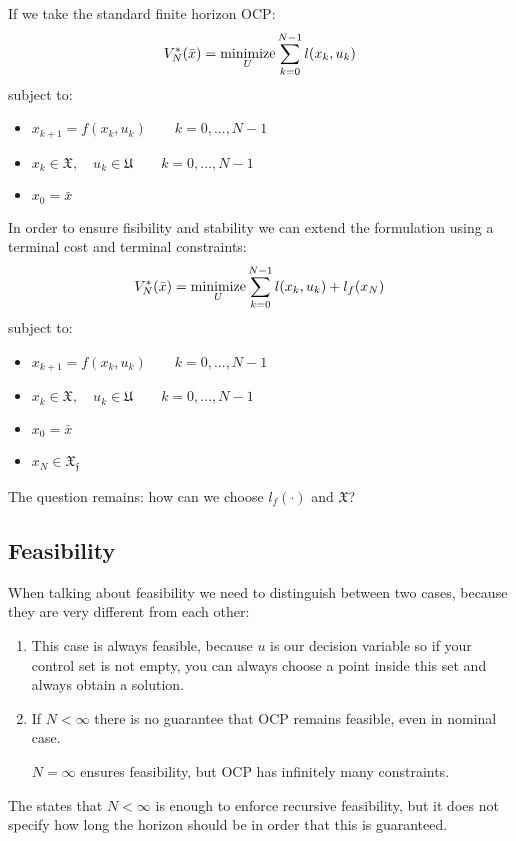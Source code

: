 If we take the standard finite horizon OCP:
\[V^*_N(\bar{x}) = \operatorname*{minimize}_U \sum_{k=0}^{N-1} l(x_k, u_k)\]
subject to:
\begin{itemize}
\item $x_{k+1} = f(x_k, u_k)\qquad k = 0,...,N-1$
\item $x_k\in\mathfrak{X},\quad u_k\in\mathfrak{U}\qquad k= 0,...,N-1$
\item $x_0 = \bar{x}$
\end{itemize}
In order to ensure fisibility and stability we can extend the formulation using a terminal cost and terminal constraints:
\[V^*_N(\bar{x}) = \operatorname*{minimize}_U \sum_{k=0}^{N-1} l(x_k, u_k) + l_f(x_N)\]
subject to:
\begin{itemize}
\item $x_{k+1} = f(x_k, u_k)\qquad k = 0,...,N-1$
\item $x_k\in\mathfrak{X},\quad u_k\in\mathfrak{U}\qquad k= 0,...,N-1$
\item $x_0 = \bar{x}$
\item $x_N\in\mathfrak{X_f}$
\end{itemize}

The question remains: how can we choose $l_f(\cdot)$ and $\mathfrak{X}$?

\subsection{Feasibility}
When talking about feasibility we need to distinguish between two cases, because they are very different from each other:
\begin{enumerate}
\item {}

This case is always feasible, because $u$ is our decision variable so if your control set is not empty, you can always choose a point inside this set and always obtain a solution.
\item {}

If $N< \infty$ there is no guarantee that OCP remains feasible, even in nominal case.

$N=\infty$ ensures feasibility, but OCP has infinitely many constraints.
\end{enumerate}

The  states that $N<\infty$ is enough to enforce recursive feasibility, but it does not specify how long the horizon should be in order that this is guaranteed.

